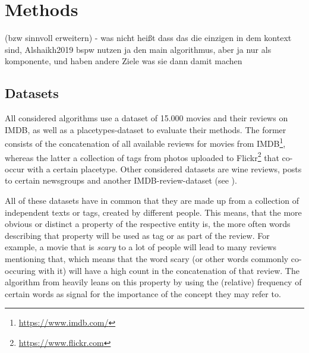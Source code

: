 \chapter{Methods}

 (bzw sinnvoll erweitern) - was nicht heißt dass das die einzigen in dem kontext sind, Alshaikh2019 bspw nutzen ja den main algorithmus, aber ja nur als komponente, und haben andere Ziele was sie dann damit machen



\section{Datasets}


All considered algorithms \mainalgos use a dataset of 15.000 movies and their reviews on IMDB, as well as a placetypes-dataset to evaluate their methods. The former consists of the concatenation of all available reviews for movies from IMDB\footnote{\url{https://www.imdb.com/}}, whereas the latter a collection of tags from photos uploaded to Flickr\footnote{\url{https://www.flickr.com}} that co-occur with a certain placetype. Other considered datasets are wine reviews, posts to certain newsgroups and another IMDB-review-dataset (see ). 

All of these datasets have in common that they are made up from a collection of independent texts or tags, created by different people. This means, that the more obvious or distinct a property of the respective entity is, the more often words describing that property will be used as tag or as part of the review. For example, a movie that is \emph{scary} to a lot of people will lead to many reviews mentioning that, which means that the word scary (or other words commonly co-occuring with it) will have a high count in the concatenation of that review. The algorithm from \cite{Derrac2015} heavily leans on this property by using the (relative) frequency of certain words as signal for the importance of the concept they may refer to. 

